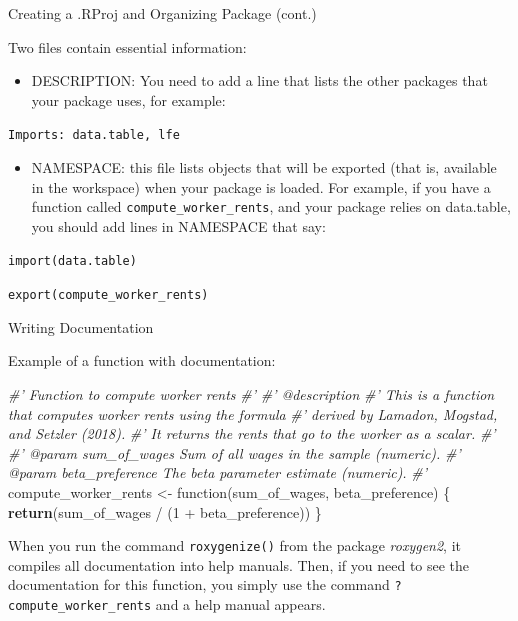 \documentclass[10pt,ignorenonframetext,]{beamer}
\newenvironment{Shaded}{\begin{snugshade}}{\end{snugshade}}
\newcommand{\KeywordTok}[1]{\textcolor[rgb]{0.13,0.29,0.53}{\textbf{{#1}}}}
\newcommand{\DecValTok}[1]{\textcolor[rgb]{0.00,0.00,0.81}{{#1}}}
\newcommand{\StringTok}[1]{\textcolor[rgb]{0.31,0.60,0.02}{{#1}}}
\newcommand{\CommentTok}[1]{\textcolor[rgb]{0.56,0.35,0.01}{\textit{{#1}}}}
\newcommand{\NormalTok}[1]{{#1}}
\providecommand{\tightlist}{%
\setlength{\itemsep}{0pt}\setlength{\parskip}{0pt}}
\begin{document}
\begin{frame}[fragile]{Creating a .RProj and Organizing Package (cont.)}

Two files contain essential information:

\begin{itemize}
\tightlist
\item
  DESCRIPTION: You need to add a line that lists the other packages that
  your package uses, for example:
\end{itemize}

\texttt{Imports:\ data.table,\ lfe}

\begin{itemize}
\tightlist
\item
  NAMESPACE: this file lists objects that will be exported (that is,
  available in the workspace) when your package is loaded. For example,
  if you have a function called \texttt{compute\_worker\_rents}, and
  your package relies on data.table, you should add lines in NAMESPACE
  that say:
\end{itemize}

\texttt{import(data.table)}

\texttt{export(compute\_worker\_rents)}

\end{frame}

\begin{frame}[fragile]{Writing Documentation}

Example of a function with documentation:

\footnotesize

\begin{Shaded}
\begin{Highlighting}[]
\CommentTok{#' Function to compute worker rents}
\CommentTok{#'}
\CommentTok{#' @description}
\CommentTok{#' This is a function that computes worker rents using the formula}
\CommentTok{#'  derived by Lamadon, Mogstad, and Setzler (2018).}
\CommentTok{#'  It returns the rents that go to the worker as a scalar.}
\CommentTok{#'   }
\CommentTok{#' @param sum_of_wages Sum of all wages in the sample (numeric).}
\CommentTok{#' @param beta_preference The beta parameter estimate (numeric).}
\CommentTok{#' }
\NormalTok{compute_worker_rents <-}\StringTok{ }\NormalTok{function(sum_of_wages, beta_preference) \{}
  \KeywordTok{return}\NormalTok{(sum_of_wages /}\StringTok{ }\NormalTok{(}\DecValTok{1} \NormalTok{+}\StringTok{ }\NormalTok{beta_preference))}
\NormalTok{\}}
\end{Highlighting}
\end{Shaded}

\normalsize

When you run the command \texttt{roxygenize()} from the package
\emph{roxygen2}, it compiles all documentation into help manuals. Then,
if you need to see the documentation for this function, you simply use
the command \texttt{?compute\_worker\_rents} and a help manual appears.

\end{frame}
\end{document}
